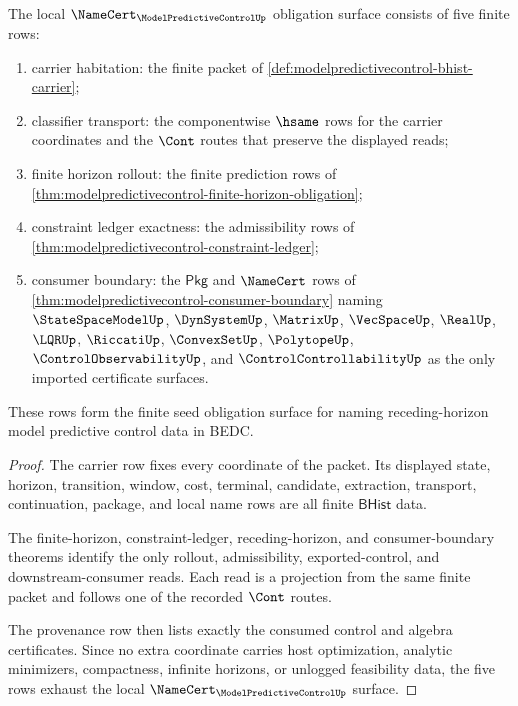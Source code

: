 \begin{theorem}
\label{thm:modelpredictivecontrol-namecert-obligation-surface}
The local $\NameCert_{\ModelPredictiveControlUp}$ obligation surface consists
of five finite rows:
\begin{enumerate}
\item carrier habitation: the finite packet of
\autoref{def:modelpredictivecontrol-bhist-carrier};
\item classifier transport: the componentwise $\hsame$ rows for the carrier
coordinates and the $\Cont$ routes that preserve the displayed reads;
\item finite horizon rollout: the finite prediction rows of
\autoref{thm:modelpredictivecontrol-finite-horizon-obligation};
\item constraint ledger exactness: the admissibility rows of
\autoref{thm:modelpredictivecontrol-constraint-ledger};
\item consumer boundary: the $\mathsf{Pkg}$ and $\NameCert$ rows of
\autoref{thm:modelpredictivecontrol-consumer-boundary} naming
$\StateSpaceModelUp$, $\DynSystemUp$, $\MatrixUp$, $\VecSpaceUp$, $\RealUp$,
$\LQRUp$, $\RiccatiUp$, $\ConvexSetUp$, $\PolytopeUp$,
$\ControlObservabilityUp$, and $\ControlControllabilityUp$ as the only
imported certificate surfaces.
\end{enumerate}
These rows form the finite seed obligation surface for naming receding-horizon
model predictive control data in BEDC.
\end{theorem}
\begin{proof}
The carrier row fixes every coordinate of the packet. Its displayed state,
horizon, transition, window, cost, terminal, candidate, extraction, transport,
continuation, package, and local name rows are all finite $\mathsf{BHist}$
data.

The finite-horizon, constraint-ledger, receding-horizon, and consumer-boundary
theorems identify the only rollout, admissibility, exported-control, and
downstream-consumer reads. Each read is a projection from the same finite
packet and follows one of the recorded $\Cont$ routes.

The provenance row then lists exactly the consumed control and algebra
certificates. Since no extra coordinate carries host optimization, analytic
minimizers, compactness, infinite horizons, or unlogged feasibility data, the
five rows exhaust the local $\NameCert_{\ModelPredictiveControlUp}$ surface.
\end{proof}

